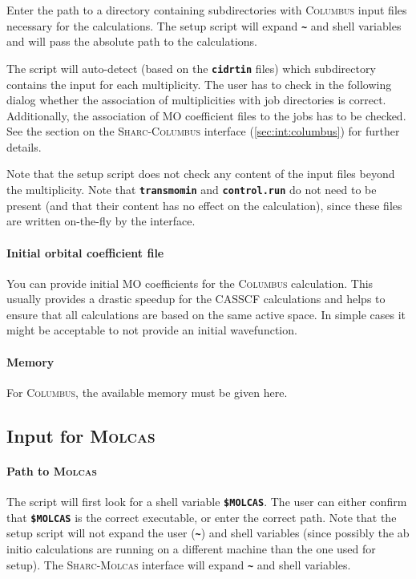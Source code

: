 \documentclass[a4paper,11pt,DIV=15,openany,twoside=false]{scrbook}
\newcommand{\sharc}{\textsc{Sharc}}
\newcommand{\ttt}[1]{\textbf{\texttt{#1}}}
\begin{document}
Enter the path to a directory containing subdirectories with \textsc{Columbus} input files necessary for the calculations. The setup script will expand \ttt{\textasciitilde} and shell variables and will pass the absolute path to the calculations.

The script will auto-detect (based on the \ttt{cidrtin} files) which subdirectory contains the input for each multiplicity. The user has to check in the following dialog whether the association of multiplicities with job directories is correct. Additionally, the association of MO coefficient files to the jobs has to be checked. See the section on the \sharc-\textsc{Columbus} interface (\ref{sec:int:columbus}) for further details. 

Note that the setup script does not check any content of the input files beyond the multiplicity. Note that \ttt{transmomin} and \ttt{control.run} do not need to be present (and that their content has no effect on the calculation), since these files are written on-the-fly by the interface. 

\paragraph{Initial orbital coefficient file}

You can provide initial MO coefficients for the \textsc{Columbus} calculation. This usually provides a drastic speedup for the CASSCF calculations and helps to ensure that all calculations are based on the same active space. In simple cases it might be acceptable to not provide an initial wavefunction.

\paragraph{Memory}

For \textsc{Columbus}, the available memory must be given here. 

\subsection{Input for \textsc{Molcas}}

\paragraph{Path to \textsc{Molcas}}

The script will first look for a shell variable \ttt{\$MOLCAS}. The user can either confirm that \ttt{\$MOLCAS} is the correct executable, or enter the correct path. Note that the setup script will not expand the user (\ttt{\textasciitilde}) and shell variables (since possibly the ab initio calculations are running on a different machine than the one used for setup). The \sharc-\textsc{Molcas} interface will expand \ttt{\textasciitilde} and shell variables.
\end{document}

